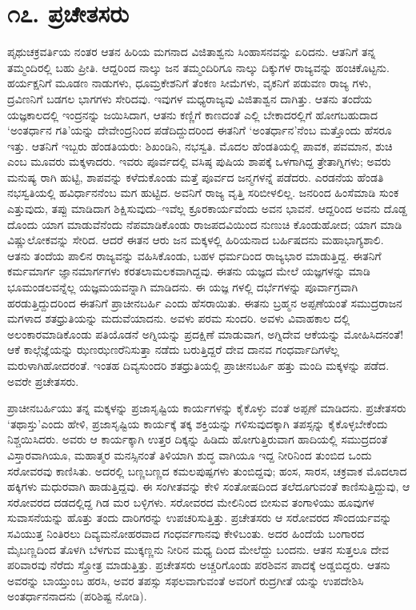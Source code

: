 
\chapter{೧೭. ಪ್ರಚೇತಸರು}

ಪೃಥುಚಕ್ರವರ್ತಿಯ ನಂತರ ಆತನ ಹಿರಿಯ ಮಗನಾದ ವಿಜಿತಾಶ್ವನು ಸಿಂಹಾಸನವನ್ನು ಏರಿದನು. ಆತನಿಗೆ ತನ್ನ ತಮ್ಮಂದಿರಲ್ಲಿ ಬಹು ಪ್ರೀತಿ. ಆದ್ದರಿಂದ ನಾಲ್ಕು ಜನ ತಮ್ಮಂದಿರಿಗೂ ನಾಲ್ಕು ದಿಕ್ಕುಗಳ ರಾಜ್ಯವನ್ನು ಹಂಚಿಕೊಟ್ಟನು. ಹರ್ಯಕ್ಷನಿಗೆ ಮೂಡಣ ನಾಡುಗಳು, ಧೂಮ್ರಕೇಶನಿಗೆ ತೆಂಕಣ ಸೀಮೆಗಳು, ವೃಕನಿಗೆ ಪಡುವಣ ರಾಜ್ಯ ಗಳು, ದ್ರವಿಣನಿಗೆ ಬಡಗಲ ಭಾಗಗಳು ಸೇರಿದವು. ಇವುಗಳ ಮಧ್ಯರಾಜ್ಯವು ವಿಜಿತಾಶ್ವನ ದಾಗಿತ್ತು. ಆತನು ತಂದೆಯ ಯಜ್ಞಕಾಲದಲ್ಲಿ ಇಂದ್ರನನ್ನು ಜಯಿಸಿದಾಗ, ಆತನು ಕಣ್ಣಿಗೆ ಕಾಣದಂತೆ ಎಲ್ಲಿ ಬೇಕಾದರಲ್ಲಿಗೆ ಹೋಗಬಹುದಾದ ‘ಅಂತರ್ಧಾನ ಗತಿ’ಯನ್ನು ದೇವೇಂದ್ರನಿಂದ ಪಡೆದಿದ್ದುದರಿಂದ ಈತನಿಗೆ ‘ಅಂತರ್ಧಾನ’ನೆಂಬ ಮತ್ತೊಂದು ಹೆಸರೂ ಇತ್ತು. ಆತನಿಗೆ ಇಬ್ಬರು ಹೆಂಡತಿಯರು: ಶಿಖಂಡಿನಿ, ನಭಸ್ವತಿ. ಮೊದಲ ಹೆಂಡತಿಯಲ್ಲಿ ಪಾವಕ, ಪವಮಾನ, ಶುಚಿ ಎಂಬ ಮೂವರು ಮಕ್ಕಳಾದರು. ಇವರು ಪೂರ್ವದಲ್ಲಿ ವಸಿಷ್ಠ ಪುಷಿಯ ಶಾಪಕ್ಕೆ ಒಳಗಾಗಿದ್ದ ತ್ರೇತಾಗ್ನಿಗಳು; ಅವರು ಮನುಷ್ಯ ರಾಗಿ ಹುಟ್ಟಿ, ಶಾಪವನ್ನು ಕಳೆದುಕೊಂಡು ಮತ್ತೆ ಪೂರ್ವದ ಜನ್ಮಗಳನ್ನೆ ಪಡೆದರು. ಎರಡನೆಯ ಹೆಂಡತಿ ನಭಸ್ವತಿಯಲ್ಲಿ ಹವಿರ್ಧಾನನೆಂಬ ಮಗ ಹುಟ್ಟಿದ. ಅವನಿಗೆ ರಾಜ್ಯ ವೃತ್ತಿ ಸರಿಬೀಳಲಿಲ್ಲ. ಜನರಿಂದ ಹಿಂಸೆಮಾಡಿ ಸುಂಕ ಎತ್ತುವುದು, ತಪ್ಪು ಮಾಡಿದಾಗ ಶಿಕ್ಷಿಸುವುದು–ಇವೆಲ್ಲ ಕ್ರೂರಕಾರ್ಯವೆಂದು ಅವನ ಭಾವನೆ. ಆದ್ದರಿಂದ ಅವನು ದೊಡ್ದ ದೊಂದು ಯಾಗ ಮಾಡುವೆನೆಂದು ನೆಪಮಾಡಿಕೊಂಡು ರಾಜಪದವಿಯಿಂದ ನುಣುಚಿ ಕೊಂಡುಹೋದ; ಯಾಗ ಮಾಡಿ ವಿಷ್ಣುಲೋಕವನ್ನು ಸೇರಿದ. ಆದರೆ ಈತನ ಆರು ಜನ ಮಕ್ಕಳಲ್ಲಿ ಹಿರಿಯನಾದ ಬರ್ಹಿಷದನು ಮಹಾಭಾಗ್ಯಶಾಲಿ. ಆತನು ತಂದೆಯ ಪಾಲಿನ ರಾಜ್ಯವನ್ನು ವಹಿಸಿಕೊಂಡು, ಬಹಳ ಧರ್ಮದಿಂದ ರಾಜ್ಯಭಾರ ಮಾಡುತ್ತಿದ್ದ. ಈತನಿಗೆ ಕರ್ಮಮಾರ್ಗ ಜ್ಞಾನಮಾರ್ಗಗಳು ಕರತಲಾಮಲಕವಾಗಿದ್ದವು. ಈತನು ಯಜ್ಞದ ಮೇಲೆ ಯಜ್ಞಗಳನ್ನು ಮಾಡಿ ಭೂಮಂಡಲವನ್ನೆಲ್ಲ ಯಜ್ಞಮಯವನ್ನಾಗಿ ಮಾಡಿದನು. ಈ ಯಜ್ಞ ಗಳಲ್ಲಿ ದರ್ಭೆಗಳನ್ನು ಪೂರ್ವಾಗ್ರವಾಗಿ ಹರಡುತ್ತಿದ್ದುದರಿಂದ ಈತನಿಗೆ ಪ್ರಾಚೀನಬರ್ಹಿ ಎಂದು ಹೆಸರಾಯಿತು. ಈತನು ಬ್ರಹ್ಮನ ಅಪ್ಪಣೆಯಂತೆ ಸಮುದ್ರರಾಜನ ಮಗಳಾದ ಶತಧ್ರುತಿಯನ್ನು ಮದುವೆಯಾದನು. ಅವಳು ಪರಮ ಸುಂದರಿ. ಅವಳು ವಿವಾಹಕಾಲ ದಲ್ಲಿ ಅಲಂಕಾರಮಾಡಿಕೊಂಡು ಪತಿಯೊಡನೆ ಅಗ್ನಿಯನ್ನು ಪ್ರದಕ್ಷಿಣೆ ಮಾಡುವಾಗ, ಅಗ್ನಿದೇವ ಆಕೆಯನ್ನು ಮೋಹಿಸಿದನಂತೆ! ಆಕೆ ಕಾಲ್ಗೆಜ್ಞೆಯನ್ನು ಝಣಝಣರೆನಿಸುತ್ತಾ ನಡೆದು ಬರುತ್ತಿದ್ದರೆ ದೇವ ದಾನವ ಗಂಧರ್ವಾದಿಗಳೆಲ್ಲ ಮರುಳಾಗಿಹೋದರಂತೆ. ಇಂತಹ ದಿವ್ಯಸುಂದರಿ ಶತಧ್ರುತಿಯಲ್ಲಿ ಪ್ರಾಚೀನಬರ್ಹಿ ಹತ್ತು ಮಂದಿ ಮಕ್ಕಳನ್ನು ಪಡೆದ. ಅವರೇ ಪ್ರಚೇತಸರು.

ಪ್ರಾಚೀನಬರ್ಹಿಯು ತನ್ನ ಮಕ್ಕಳನ್ನು ಪ್ರಜಾಸೃಷ್ಟಿಯ ಕಾರ್ಯಗಳನ್ನು ಕೈಕೊಳ್ಳು ವಂತೆ ಅಪ್ಪಣೆ ಮಾಡಿದನು. ಪ್ರಚೇತಸರು ‘ತಥಾಸ್ತು’ಎಂದು ಹೇಳಿ, ಪ್ರಜಾಸೃಷ್ಟಿಯ ಕಾರ್ಯಕ್ಕೆ ತಕ್ಕ ಶಕ್ತಿಯನ್ನು ಗಳಿಸುವುದಕ್ಕಾಗಿ ತಪಸ್ಸನ್ನು ಕೈಕೊಳ್ಳಬೇಕೆಂದು ನಿಶ್ಚಯಿಸಿದರು. ಅವರು ಆ ಕಾರ್ಯಕ್ಕಾಗಿ ಉತ್ತರ ದಿಕ್ಕನ್ನು ಹಿಡಿದು ಹೋಗುತ್ತಿರುವಾಗ ಹಾದಿಯಲ್ಲಿ ಸಮುದ್ರದಂತೆ ವಿಸ್ತಾರವಾಗಿಯೂ, ಮಹಾತ್ಮರ ಮನಸ್ಸಿನಂತೆ ತಿಳಿಯಾಗಿ ಶುದ್ಧ ವಾಗಿಯೂ ಇದ್ದ ನೀರಿನಿಂದ ತುಂಬಿದ ಒಂದು ಸರೋವರವು ಕಾಣಿಸಿತು. ಅದರಲ್ಲಿ ಬಣ್ಣಬಣ್ಣದ ಕಮಲಪುಷ್ಪಗಳು ತುಂಬಿದ್ದವು; ಹಂಸ, ಸಾರಸ, ಚಕ್ರವಾಕ ಮೊದಲಾದ ಹಕ್ಕಿಗಳು ಮಧುರವಾಗಿ ಹಾಡುತ್ತಿದ್ದವು. ಈ ಸಂಗೀತವನ್ನು ಕೇಳಿ ಸಂತೋಷದಿಂದ ತಲೆದೂಗುವಂತೆ ಕಾಣಿಸುತ್ತಿದ್ದುವು, ಆ ಸರೋವರದ ದಡದಲ್ಲಿದ್ದ ಗಿಡ ಮರ ಬಳ್ಳಿಗಳು. ಸರೋವರದ ಮೇಲಿನಿಂದ ಬೀಸುವ ತಂಗಾಳಿಯು ಹೂವುಗಳ ಸುವಾಸನೆಯನ್ನು ಹೊತ್ತು ತಂದು ದಾರಿಗರನ್ನು ಉಪಚರಿಸುತ್ತಿತ್ತು. ಪ್ರಚೇತಸರು ಆ ಸರೋವರದ ಸೌಂದರ್ಯವನ್ನು ಸವಿಯುತ್ತ ನಿಂತಿರಲು ದಿವ್ಯಮನೋಹರವಾದ ಗಂಧರ್ವಗಾನವು ಕೇಳಿಬಂತು. ಅದರ ಹಿಂದೆಯೆ ಬಂಗಾರದ ಮೈಬಣ್ಣದಿಂದ ತೊಳಗಿ ಬೆಳಗುವ ಮುಕ್ಕಣ್ಣನು ನೀರಿನ ಮಧ್ಯ ದಿಂದ ಮೇಲೆದ್ದು ಬಂದನು. ಆತನ ಸುತ್ತಲೂ ದೇವ ಪರಿವಾರವು ನೆರೆದು ಸ್ತ್ರೋತ್ರ ಮಾಡುತ್ತಿತ್ತು. ಪ್ರಚೇತಸರು ಅಚ್ಚರಿಗೊಂಡು ಪರಶಿವನ ಪಾದಕ್ಕೆ ಅಡ್ಡಬಿದ್ದರು. ಆತನು ಅವರನ್ನು ಬಾಯ್ತುಂಬ ಹರಸಿ, ಅವರ ತಪಸ್ಸು ಸಫಲವಾಗುವಂತೆ ಅವರಿಗೆ ರುದ್ರಗೀತೆ ಯನ್ನು ಉಪದೇಶಿಸಿ ಅಂತರ್ಧಾನನಾದನು (ಪರಿಶಿಷ್ಟ ನೋಡಿ).

